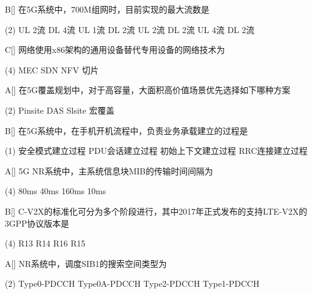 \begin{choice}{B}[]
    在5G系统中，700M组网时，目前实现的最大流数是
    \begin{tasks}(2)
        \task UL 2流 DL 4流
        \task UL 1流 DL 2流
        \task UL 2流 DL 2流
        \task UL 4流 DL 2流
    \end{tasks}
\end{choice}


\begin{choice}{C}[]
    网络使用x86架构的通用设备替代专用设备的网络技术为
    \begin{tasks}(4)
        \task MEC
        \task SDN
        \task NFV
        \task 切片
    \end{tasks}
\end{choice}


\begin{choice}{A}[]
    在5G覆盖规划中，对于高容量，大面积高价值场景优先选择如下哪种方案
    \begin{tasks}(2)
        \task Pinsite
        \task DAS
        \task Slsite
        \task 宏覆盖
    \end{tasks}
\end{choice}

\begin{choice}{B}[]
    在5G系统中，在手机开机流程中，负责业务承载建立的过程是
    \begin{tasks}(1)
        \task 安全模式建立过程
        \task PDU会话建立过程
        \task 初始上下文建立过程
        \task RRC连接建立过程
    \end{tasks}
\end{choice}

\begin{choice}{A}[]
    5G NR系统中，主系统信息块MIB的传输时间间隔为
    \begin{tasks}(4)
        \task 80ms
        \task 40ms
        \task 160ms
        \task 10ms
    \end{tasks}
\end{choice}



\begin{choice}{B}[]
    C-V2X的标准化可分为多个阶段进行，其中2017年正式发布的支持LTE-V2X的3GPP协议版本是
    \begin{tasks}(4)
        \task R13
        \task R14
        \task R16
        \task R15
    \end{tasks}
\end{choice}

\begin{choice}{A}[]
    NR系统中，调度SIB1的搜索空间类型为
    \begin{tasks}(2)
        \task Type0-PDCCH
        \task Type0A-PDCCH
        \task Type2-PDCCH
        \task Type1-PDCCH
    \end{tasks}
\end{choice}


